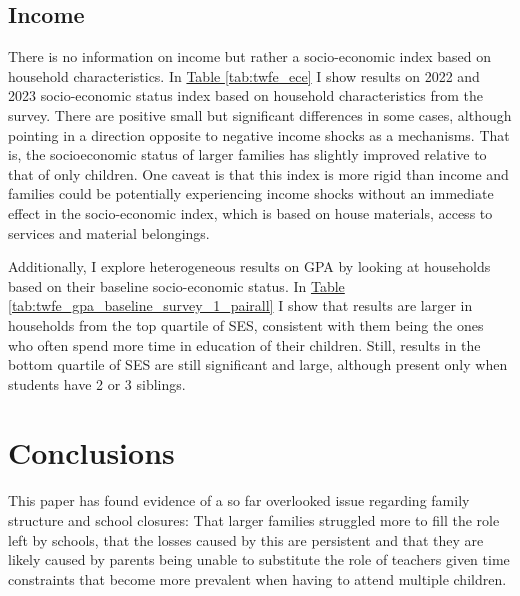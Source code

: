 \subsection{Income}

There is no information on income but rather a socio-economic index based on household characteristics. In \hyperref[tab:twfe_ece]{Table \ref{tab:twfe_ece}} I show results on 2022 and 2023 socio-economic status index based on household characteristics from the survey. There are positive small but significant differences in some cases, although pointing in a direction opposite to negative income shocks as a mechanisms. That is, the socioeconomic status of larger families has slightly improved relative to that of only children. One caveat is that this index is more rigid than income and families could be potentially experiencing income shocks without an immediate effect in the socio-economic index, which is based on house materials, access to services and material belongings.

Additionally, I explore heterogeneous results on GPA by looking at households based on their baseline socio-economic status. In \hyperref[tab:twfe_gpa_baseline_survey_1_pairall]{Table \ref{tab:twfe_gpa_baseline_survey_1_pairall}} I show that results are larger in households from the top quartile of SES, consistent with them being the ones who often spend more time in education of their children. Still, results in the bottom quartile of SES are still significant and large, although present only when students have 2 or 3 siblings.





\section{Conclusions}\label{sec:conclusions}

This paper has found evidence of a so far overlooked issue regarding family structure and school closures: That larger families struggled more to fill the role left by schools, that the losses caused by this are persistent and that they are likely caused by parents being unable to substitute the role of teachers given time constraints that become more prevalent when having to attend multiple children.

